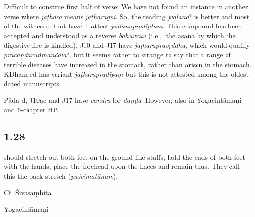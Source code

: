 \begin{ekdosis}
\begin{testimonia}[hp01_027]
\end{testimonia}

\begin{philcomm}[hp01_027]
Difficult to construe first half of verse:
We have not found an instance in another verse where \emph{jaṭhara} means \emph{jaṭharāgni}. So, the reading \emph{jvalana}° is better and most of the witnesses that have it attest \emph{jvalanapradīptam}. This compound has been accepted and understood as a reverse \emph{bahuvrīhi} (i.e., ‘the āsana by which the digestive fire is kindled). J10 and J17 have \emph{jaṭharapravṛddha}, which would qualify \emph{pracaṇḍaruṅmaṇḍala}°, but it seems rather to strange to say that a range of terrible diseases have increased in the stomach, rather than arisen in the stomach. KDham ed has variant \emph{jaṭharapradīpaṃ} but this is not attested among the oldest dated manuscripts.

Pāda d, J10ac and J17 have \emph{candra} for \emph{daṇḍa}; However,  also in Yogacintāmaṇi and 6-chapter HP.
\end{philcomm}

\subsection*{1.28}
\begin{translation} should stretch out both feet on the ground like staffs, hold the ends of both feet with the hands, place the forehead upon the knees and remain thus. They call this the back-stretch (\emph{paścimatānam}).
\end{translation}

\begin{sources}[hp01_028]
Cf. Śivasaṃhitā

\begin{versinnote}
\end{versinnote}

\end{sources}

\begin{testimonia}[hp01_028]
Yogacintāmaṇi

\begin{versinnote}
\end{versinnote}


\end{testimonia}
\end{ekdosis}
